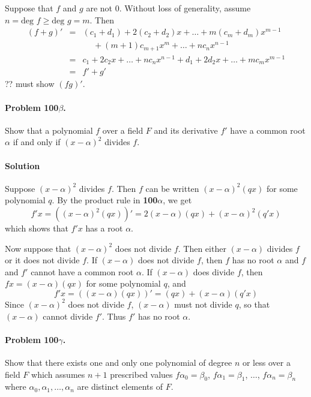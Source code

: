 Suppose that $f$ and $g$ are not $0$. Without loss of generality, assume
$n = \mbox{deg } f \geq \mbox{deg } g = m$. Then
\begin{eqnarray*}
(f+g)' & = & (c_1+d_1) + 2(c_2+d_2)x + \dots + m(c_m+d_m)x^{m-1} \\
& & \hspace{15pt} + (m+1)c_{m+1}x^m + \dots + nc_n x^{n-1} \\
& = & c_1 + 2c_2 x + \dots + nc_n x^{n-1} + d_1 + 2d_2 x + \dots + mc_m x^{m-1} \\
& = & f' + g'
\end{eqnarray*}
?? must show $(fg)'$.

\paragraph{Problem 100$\beta$.}
Show that a polynomial $f$ over a field $F$ and its derivative $f'$ have a common
root $\alpha$ if and only if $(x-\alpha)^2$ divides $f$.

\paragraph*{Solution}
Suppose $(x-\alpha)^2$ divides $f$. Then $f$ can be written $(x-\alpha)^2(qx)$
for some polynomial $q$. By the product rule in \textbf{100$\alpha$}, we get
$$f'x = ((x-\alpha)^2(qx))' = 2(x-\alpha)(qx) + (x-\alpha)^2(q'x)$$
which shows that $f'x$ has a root $\alpha$.

Now suppose that $(x-\alpha)^2$ does not divide $f$. Then either $(x-\alpha)$
divides $f$ or it does not divide $f$. If $(x-\alpha)$ does not divide $f$, then $f$ has
no root $\alpha$ and $f$ and $f'$ cannot have a common root $\alpha$. If $(x-\alpha)$
does divide $f$, then $fx = (x-\alpha)(qx)$ for some polynomial $q$, and
$$f'x = ((x-\alpha)(qx))' = (qx) + (x-\alpha)(q'x)$$
Since $(x-\alpha)^2$ does not divide $f$, $(x-\alpha)$ must not divide $q$, so
that $(x-\alpha)$ cannot divide $f'$. Thus $f'$ has no root $\alpha$.

\paragraph{Problem 100$\gamma$.}
Show that there exists one and only one polynomial of degree $n$ or less over a
field $F$ which assumes $n+1$ prescribed values $f\alpha_0 = \beta_0$,
$f\alpha_1 = \beta_1$, $\dots$, $f\alpha_n = \beta_n$ where $\alpha_0, \alpha_1,
\dots , \alpha_n$ are distinct elements of $F$.

